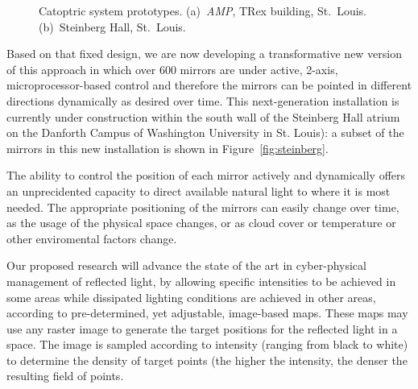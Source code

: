 \begin{figure}[ht]
\centering
{}
\qquad \qquad
{}
\caption{Catoptric system prototypes.
(a)~\emph{AMP}, TRex building, St.~Louis.
(b)~Steinberg Hall, St.~Louis.
}
\label{fig:proto}
\end{figure}

Based on that fixed design, we are now developing a transformative 
new version of this approach in which over 600 mirrors are under 
active, 2-axis, microprocessor-based control and therefore the mirrors
can be pointed in different directions dynamically as desired over time. 
This next-generation installation is currently under construction within 
the south wall of the Steinberg Hall atrium on the Danforth Campus of 
Washington University in St. Louis): a subset of the mirrors in this new
installation is shown in Figure~\ref{fig:steinberg}.

The ability to control the position of each mirror actively and dynamically
offers an unprecidented capacity to direct available natural light to where
it is most needed.  The appropriate positioning of the mirrors can easily 
change over time, as the usage of the physical space changes, or as cloud
cover or temperature or other enviromental factors change.

Our proposed research will advance the state of the art in cyber-physical
management of reflected light, by allowing specific intensities to be achieved
in some areas while dissipated lighting conditions are achieved in other areas, 
according to pre-determined, yet adjustable, image-based maps. These maps may 
use any raster image to generate the target positions for the reflected light 
in a space.  
The image is sampled according to intensity (ranging from 
black to white) to determine the density of target points (the higher the 
intensity, the denser the resulting field of points. 

